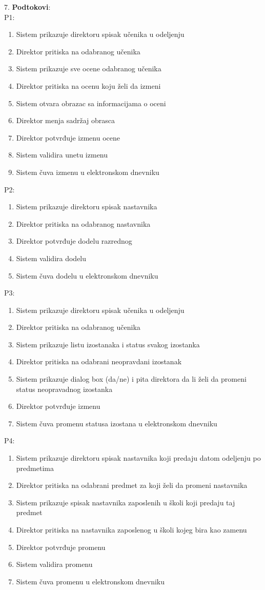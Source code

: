 \documentclass{article}
\begin{document}
7. \textbf{Podtokovi}: \\
P1: 
\begin{enumerate} [label=(\alph*)]
\item Sistem prikazuje direktoru spisak učenika u odeljenju
\item Direktor pritiska na odabranog učenika
\item Sistem prikazuje sve ocene odabranog učenika
\item Direktor pritiska na ocenu koju želi da izmeni
\item Sistem otvara obrazac sa informacijama o oceni
\item Direktor menja sadržaj obrasca
\item Direktor potvrđuje izmenu ocene
\item Sistem validira unetu izmenu
\item Sistem čuva izmenu u elektronskom dnevniku
\end{enumerate}
P2:
\begin{enumerate} [label=(\alph*)]
\item Sistem prikazuje direktoru spisak nastavnika
\item Direktor pritiska na odabranog nastavnika
\item Direktor potvrđuje dodelu razrednog
\item Sistem validira dodelu
\item Sistem čuva dodelu u elektronskom dnevniku
\end{enumerate}
P3:
\begin{enumerate} [label=(\alph*)]
\item Sistem prikazuje direktoru spisak učenika u odeljenju
\item Direktor pritiska na odabranog učenika
\item Sistem prikazuje listu izostanaka i status svakog izostanka
\item Direktor pritiska na odabrani neopravdani izostanak
\item Sistem prikazuje dialog box (da/ne) i pita direktora da li želi da promeni status neopravadnog izostanka
\item Direktor potvrđuje izmenu
\item Sistem čuva promenu statusa izostana u elektronskom dnevniku
\end{enumerate}
P4:
\begin{enumerate} [label=(\alph*)]
\item Sistem prikazuje direktoru spisak nastavnika koji predaju datom odeljenju po predmetima
\item Direktor pritiska na odabrani predmet za koji želi da promeni nastavnika
\item Sistem prikazuje spisak nastavnika zaposlenih u školi koji predaju taj predmet
\item Direktor pritiska na nastavnika zaposlenog u školi kojeg bira kao zamenu
\item Direktor potvrđuje promenu 
\item Sistem validira promenu
\item Sistem čuva promenu u elektronskom dnevniku
\end{enumerate}
\end{document}
